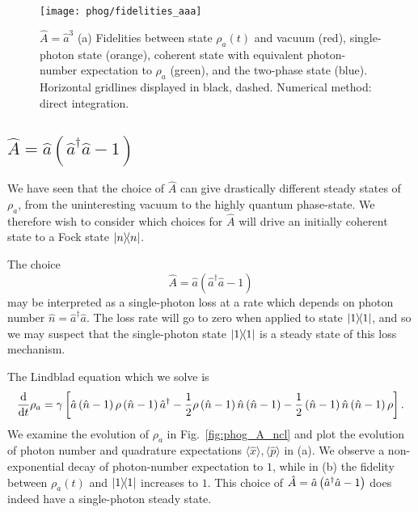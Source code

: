 \begin{figure}[htp]
\centering
\texttt{[image: phog/fidelities\_aaa]}
\caption{\label{fig:phog_lindblad_three_photon_loss}$\hat{A} = \hat{a}^3$ (a) Fidelities between state $\rho_a\left(t\right)$ and vacuum (red), single-photon state (orange), coherent state with equivalent photon-number expectation to $\rho_a$ (green), and the two-phase state (blue).  Horizontal gridlines displayed in black, dashed. Numerical method: direct integration.}
\end{figure}
\fi

\FloatBarrier
\subsection{$\hat{A} = \hat{a}\left(\hat{a}^\dagger \hat{a} - 1\right)$}\label{sec:A_ncl}
We have seen that the choice of $\hat{A}$ can give drastically different steady states of $\rho_a$,  from the uninteresting vacuum to the highly quantum phase-state. We therefore wish to consider which choices for $\hat{A}$ will drive an initially coherent state to a Fock state $\dyad{n}$. 

The choice 
\begin{equation}\label{eqn:phog_A_ncl}
\hat{A} = \hat{a}\left(\hat{a}^\dagger \hat{a} - 1\right)
\end{equation}
may be interpreted as a single-photon loss at a rate which depends on photon number $\hat{n} = \hat{a}^\dagger \hat{a}$. The loss rate will go to zero when applied to state $\dyad{1}$, and so we may suspect that the single-photon state $\dyad{1}$ is a steady state of this loss mechanism.

The Lindblad equation which we solve is
\begin{equation}\label{eqn:phog_ncl_lindblad}
\frac{\mathrm{d}}{\mathrm{d}t} \rho_a = \gamma \left[ \hat{a}\left(\hat{n}-1\right) \rho \left(\hat{n}-1\right)\hat{a}^\dagger - \frac{1}{2} \rho \left(\hat{n}-1\right) \hat{n} \left(\hat{n}-1\right) - \frac{1}{2} \left(\hat{n}-1\right)\hat{n}\left(\hat{n}-1\right) \rho \right].
\end{equation}
We examine the evolution of $\rho_a$ in Fig.~\ref{fig:phog_A_ncl} and plot the evolution of photon number and quadrature expectations $\langle \hat{x}\rangle, \langle \hat{p}\rangle$ in (a). We observe a non-exponential decay of photon-number expectation to $1$,
while in (b) the fidelity between $\rho_a\left(t\right)$ and $\dyad{1}$ increases to $1$. This choice of $\hat{A} = \hat{a}\left(\hat{a}^\dagger \hat{a} - 1\right)$ does indeed have a single-photon steady state. 

